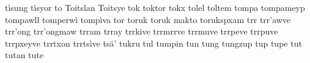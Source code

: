 tìsung\hspace{2mm}
tìsyor\hspace{2mm}
to\hspace{2mm}
Toitslan\hspace{2mm}
Toitsye\hspace{2mm}
tok\hspace{2mm}
toktor\hspace{2mm}
tokx\hspace{2mm}
tolel\hspace{2mm}
toltem\hspace{2mm}
tompa\hspace{2mm}
tompameyp\hspace{2mm}
tompawll\hspace{2mm}
tomperwì\hspace{2mm}
tompìva\hspace{2mm}
tor\hspace{2mm}
toruk\hspace{2mm}
toruk makto\hspace{2mm}
torukspxam\hspace{2mm}
trr\hspace{2mm}
trr'awve\hspace{2mm}
trr'ong\hspace{2mm}
trr'ongmaw\hspace{2mm}
trram\hspace{2mm}
trray\hspace{2mm}
trrkive\hspace{2mm}
trrmrrve\hspace{2mm}
trrmuve\hspace{2mm}
trrpeve\hspace{2mm}
trrpuve\hspace{2mm}
trrpxeyve\hspace{2mm}
trrtxon\hspace{2mm}
trrtsìve\hspace{2mm}
tsä'\hspace{2mm}
tukru\hspace{2mm}
tul\hspace{2mm}
tumpin\hspace{2mm}
tun\hspace{2mm}
tung\hspace{2mm}
tungzup\hspace{2mm}
tup\hspace{2mm}
tupe\hspace{2mm}
tut\hspace{2mm}
tutan\hspace{2mm}
tute\hspace{2mm}
